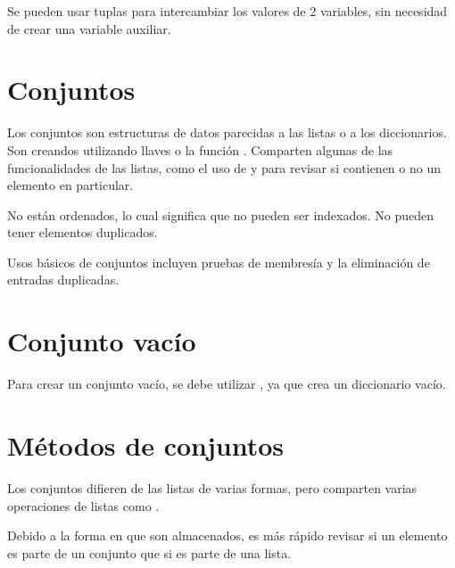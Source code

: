 
Se pueden usar tuplas para intercambiar los valores de 2 variables, sin necesidad de crear una variable auxiliar.


\section{Conjuntos}

Los conjuntos son estructuras de datos parecidas a las listas o a los diccionarios. Son creandos utilizando llaves \ttt{\{\}}o la función . Comparten algunas de las funcionalidades de las listas, como el uso de  y  para revisar si contienen o no un elemento en particular.


No están ordenados, lo cual significa que no pueden ser indexados. No pueden tener elementos duplicados.


Usos básicos de conjuntos incluyen pruebas de membresía y la eliminación de entradas duplicadas.

\section{Conjunto vacío}

Para crear un conjunto vacío, se debe utilizar , ya que \ttt{\{\}} crea un diccionario vacío.


\section{Métodos de conjuntos}

Los conjuntos difieren de las listas de varias formas, pero comparten varias operaciones de listas como .


Debido a la forma en que son almacenados, es más rápido revisar si un elemento es parte de un conjunto que si es parte de una lista.\smallskip

